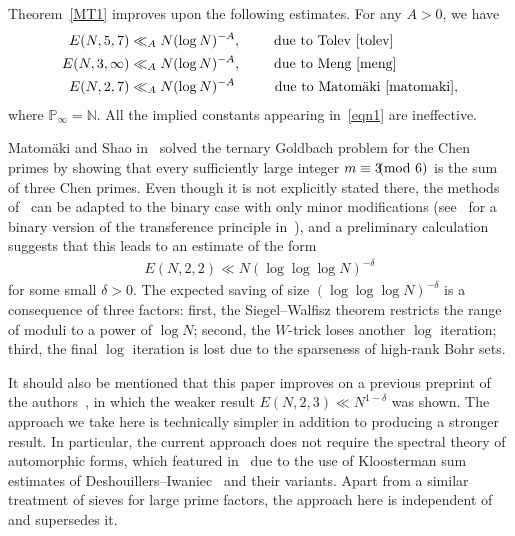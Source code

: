 \documentclass[12pt]{amsart}
\theoremstyle{definition}
\theoremstyle{remark}
\numberwithin{equation}{section}
\newcommand{\1}{\mathbf{1}}
\let\oldpmod\pmod
\renewcommand{\pmod}[1]{\hspace{-0.12cm}\oldpmod {#1}}
\begin{document}
Theorem~\ref{MT1} improves upon the following estimates. For any $A>0$,  we have
\begin{align}
    \begin{split}\label{eqn1}
	   E(N,5,7)&\ll_A N(\log N)^{-A}, \quad \quad \text{ due to Tolev~\cite{tolev}}\\
		E(N,3,\infty)&\ll_A N(\log N)^{-A}, \quad \quad \,\,\text{due to Meng~\cite{meng}}\\
		E(N,2,7)&\ll_A N(\log N)^{-A} \quad \quad \,\,\,\,\, \text{due to Matom\"aki~\cite{matomaki}},
	\end{split}
\end{align}
where $\mathbb{P}_\infty=\mathbb{N}$. All the implied constants appearing in~\eqref{eqn1} are ineffective. 

Matom\"aki and Shao in~\cite{matomaki-shao} solved the ternary Goldbach problem for the Chen primes by showing that every sufficiently large integer $m\equiv 3\pmod 6$ is the sum of three Chen primes. Even though it is not explicitly stated there, the methods of~\cite{matomaki-shao} can be adapted to the binary case with only minor modifications (see~\cite[Proposition 2.1]{tera-goldbach} for a binary version of the transference principle in~\cite{matomaki-shao}), and a preliminary calculation suggests that this leads to an estimate of the form
\begin{align*}
	E(N,2,2)\ll N(\log\log\log N)^{-\delta}
\end{align*}
for some small $\delta>0$. The expected saving of size $(\log \log \log N)^{-\delta}$ is a consequence of three factors: first, the Siegel--Walfisz theorem restricts the range of moduli to a power of $\log N$; second, the $W$-trick loses another $\log$ iteration; third, the final $\log$ iteration is lost due to the sparseness of high-rank Bohr sets. 

It should also be mentioned that this paper improves on a previous preprint of the authors~\cite{grimmelt-teravainen}, in which the weaker result $E(N,2,3)\ll N^{1-\delta}$ was shown. The approach we take here is technically simpler in addition to producing a stronger result. In particular, the current approach does not require the spectral theory of automorphic forms, which featured in~\cite{grimmelt-teravainen} due to the use of Kloosterman sum estimates of Deshouillers--Iwaniec~\cite{DI} and their variants. Apart from a similar treatment of sieves for large prime factors, the approach here is independent of~\cite{grimmelt-teravainen} and supersedes it.
 
\end{document}
